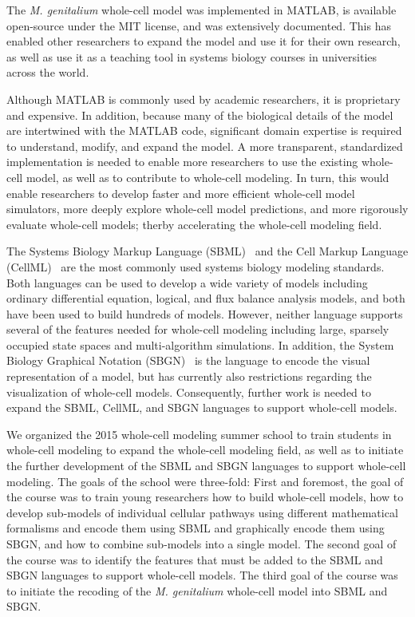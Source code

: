 \documentclass[journal,transmag]{IEEEtran}
\begin{document}
The \textit{M. genitalium} whole-cell model was implemented in MATLAB, is available open-source under the MIT license, and was extensively documented. 
This has enabled other researchers to expand the model and use it for their own research, as well as use it as a teaching tool in systems biology courses in universities across the world. 

Although MATLAB is commonly used by academic researchers, it is proprietary and expensive. In addition, because many of the biological details of the model are intertwined with the MATLAB code, significant domain expertise is required to understand, modify, and expand the model. 
A more transparent, standardized implementation is needed to enable more researchers to use the existing whole-cell model, as well as to contribute to whole-cell modeling. 
In turn, this would enable researchers to develop faster and more efficient whole-cell model simulators, more deeply explore whole-cell model predictions, and more rigorously evaluate whole-cell models; therby accelerating the whole-cell modeling field.

The Systems Biology Markup Language (SBML)~\cite{hucka2003} and the Cell Markup Language (CellML)~\cite{hedley_2001b} are the most commonly used systems biology modeling standards. 
Both languages can be used to develop a wide variety of models including ordinary differential equation, logical, and flux balance analysis models, and both have been used to build hundreds of models. 
However, neither language supports several of the features needed for whole-cell modeling including large, sparsely occupied state spaces and multi-algorithm simulations. 
In addition, the System Biology Graphical Notation (SBGN)~\cite{LeNovereHMMSS09} is the language to encode the visual representation of a model, but has currently also restrictions regarding the visualization of whole-cell models. 
Consequently, further work is needed to expand the SBML, CellML, and SBGN languages to support whole-cell models.

We organized the 2015 whole-cell modeling summer school to train students in whole-cell modeling to expand the whole-cell modeling field, as well as to initiate the further development of the SBML and SBGN languages to support whole-cell modeling. 
The goals of the school were three-fold: 
First and foremost, the goal of the course was to train young researchers how to build whole-cell models, how to develop sub-models of individual cellular pathways using different mathematical formalisms and encode them using SBML and graphically encode them using SBGN, and how to combine sub-models into a single model. 
The second goal of the course was to identify the features that must be added to the SBML and SBGN languages to support whole-cell models. 
The third goal of the course was to initiate the recoding of the \textit{M. genitalium} whole-cell model into SBML and SBGN.
\end{document}
